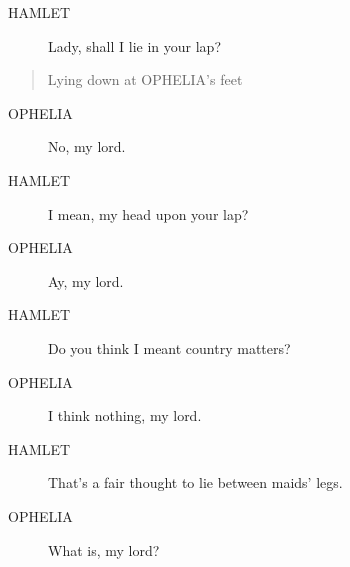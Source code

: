 \documentclass{article}
\begin{document}
\begin{description}
            
\item[HAMLET] Lady, shall I lie in your lap?
\end{description}
          
\begin{quote}
Lying down at OPHELIA's feet
\end{quote}
          
\begin{description}
            
\item[OPHELIA] No, my lord.
\end{description}
          
\begin{description}
            
\item[HAMLET] I mean, my head upon your lap?
\end{description}
          
\begin{description}
            
\item[OPHELIA] Ay, my lord.
\end{description}
          
\begin{description}
            
\item[HAMLET] Do you think I meant country matters?
\end{description}
          
\begin{description}
            
\item[OPHELIA] I think nothing, my lord.
\end{description}
          
\begin{description}
            
\item[HAMLET] That's a fair thought to lie between maids' legs.
\end{description}
          
\begin{description}
            
\item[OPHELIA] What is, my lord?
\end{description}
          
\end{document}
